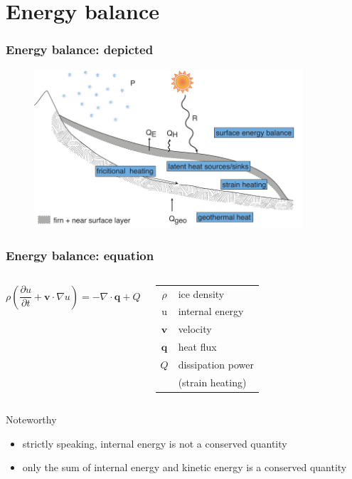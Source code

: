 \documentclass[hide notes,intlimits]{beamer}
\newcommand{\bq}{\mathbf{q}}
\newcommand{\bv}{\mathbf{v}}
\newcommand{\ddt}[1]{\ensuremath{\frac{\partial #1}{\partial t}}}
\newcommand{\Div}{\nabla\cdot}
\newcommand{\grad}{\nabla}
\begin{document}
\section{Energy balance}
\label{sec:energy-balance}

\begin{frame}
  \frametitle{Energy balance: depicted}
  \begin{figure}
    \includegraphics[width=10cm]{figures/glacier_thermodynamics}
  \end{figure}
\end{frame}


\begin{frame}
  \frametitle{Energy balance: equation}
  \begin{columns}
    \column[c]{7cm}
    \begin{equation*}
      \rho \left(\ddt{u} + \bv \cdot \grad u\right) = - \Div \bq + Q
    \end{equation*}
   \vspace{2em}
    \column[c]{6cm}
      \begin{tabular}{cl}
        $\rho$ \quad & ice density \\
        u \quad & internal energy \\
        $\bv$ \quad & velocity \\
        $\bq$ \quad & heat flux \\
        $Q$ \quad & dissipation power \\
             & (strain heating)
      \end{tabular}
    \end{columns}
    \begin{block}{Noteworthy}
      \begin{itemize}
      \item strictly speaking, internal energy is \alert{not} a conserved quantity
      \item only the sum of \alert{internal energy} and \alert{kinetic energy} is a conserved quantity
      \end{itemize}
    \end{block}
\end{frame}
\end{document}
